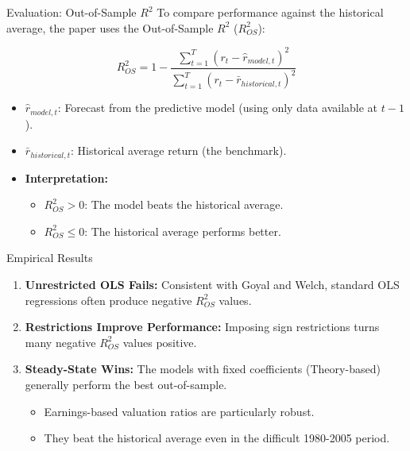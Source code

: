 \documentclass{beamer}
\begin{document}
\begin{frame}{Evaluation: Out-of-Sample $R^2$}
    To compare performance against the historical average, the paper uses the Out-of-Sample $R^2$ ($R^2_{OS}$):

    \begin{equation}
        R^2_{OS} = 1 - \frac{\sum_{t=1}^T (r_t - \hat{r}_{model, t})^2}{\sum_{t=1}^T (r_t - \bar{r}_{historical, t})^2}
    \end{equation}

    \begin{itemize}
        \item $\hat{r}_{model, t}$: Forecast from the predictive model (using only data available at $t-1$).
        \item $\bar{r}_{historical, t}$: Historical average return (the benchmark).
        \item \textbf{Interpretation:} 
            \begin{itemize}
                \item \textbf{$R^2_{OS} > 0$}: The model beats the historical average.
                \item \textbf{$R^2_{OS} \le 0$}: The historical average performs better.
            \end{itemize}
    \end{itemize}
\end{frame}

\begin{frame}{Empirical Results}
    \begin{enumerate}
        \item \textbf{Unrestricted OLS Fails:} 
            Consistent with Goyal and Welch, standard OLS regressions often produce negative $R^2_{OS}$ values.
        
        \item \textbf{Restrictions Improve Performance:}
            Imposing sign restrictions turns many negative $R^2_{OS}$ values positive.
            
        \item \textbf{Steady-State Wins:}
            The models with fixed coefficients (Theory-based) generally perform the best out-of-sample.
            \begin{itemize}
                \item Earnings-based valuation ratios are particularly robust.
                \item They beat the historical average even in the difficult 1980-2005 period.
            \end{itemize}
    \end{enumerate}
\end{frame}
\end{document}
